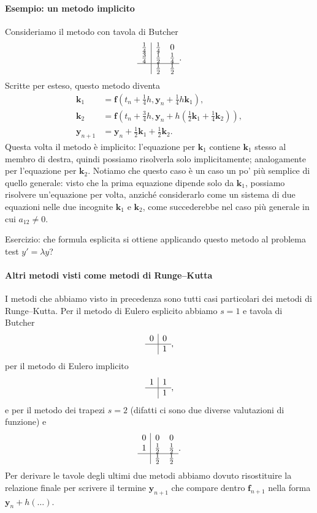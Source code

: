 \documentclass[a4paper]{report}
\theoremstyle{definiton}
\theoremstyle{remark}
\newcommand{\y}{\mathbf{y}}
\begin{document}
\paragraph{Esempio: un metodo implicito}
Consideriamo il metodo con tavola di Butcher
\[
\begin{array}{c|cc}
\frac14 & \frac14 & 0\\
\frac34 & \frac12 & \frac14\\
\hline
& \frac12 & \frac12
\end{array}.
\]
Scritte per esteso, questo metodo diventa
\begin{align*}
    \mathbf{k}_1 &= \mathbf{f}(t_n + \frac14 h, \mathbf{y}_n +  \frac14 h \mathbf{k}_1),\\
    \mathbf{k}_2 &= \mathbf{f}(t_n + \frac34 h, \mathbf{y}_n + h(\frac12 \mathbf{k}_1 + \frac14 \mathbf{k}_2)),\\
    \mathbf{y}_{n+1} &= \mathbf{y}_n + \frac12 \mathbf{k}_1 + \frac12 \mathbf{k}_2.
\end{align*}
Questa volta il metodo è implicito: l'equazione per $\mathbf{k}_1$ contiene $\mathbf{k}_1$ stesso al membro di destra, quindi possiamo risolverla solo implicitamente; analogamente per l'equazione per $\mathbf{k}_2$. Notiamo che questo caso è un caso un po' più semplice di quello generale: visto che la prima equazione dipende solo da $\mathbf{k}_1$, possiamo risolvere un'equazione per volta, anziché considerarlo come un sistema di due equazioni nelle due incognite $\mathbf{k}_1$ e $\mathbf{k}_2$, come succederebbe nel caso più generale in cui $a_{12}\neq 0$.

Esercizio: che formula esplicita si ottiene applicando questo metodo al problema test $y' = \lambda y$?

\paragraph{Altri metodi visti come metodi di Runge--Kutta}
I metodi che abbiamo visto in precedenza sono tutti casi particolari dei metodi di Runge--Kutta. Per il metodo di Eulero esplicito abbiamo $s=1$ e tavola di Butcher
\[
\begin{array}{c|c}
0 & 0\\
\hline
 & 1
\end{array},
\]
per il metodo di Eulero implicito
\[
\begin{array}{c|c}
1 & 1\\
\hline
 & 1
\end{array},
\]
e per il metodo dei trapezi $s=2$ (difatti ci sono due diverse valutazioni di funzione) e 
\[
\begin{array}{c|cc}
0 & 0 & 0\\
1 & \frac12 & \frac12\\
\hline
& \frac12 & \frac12
\end{array}.
\]
Per derivare le tavole degli ultimi due metodi abbiamo dovuto risostituire la relazione finale per scrivere il termine $\y_{n+1}$ che compare dentro $\mathbf{f}_{n+1}$ nella forma $\y_n + h(\dots)$.
\end{document}
